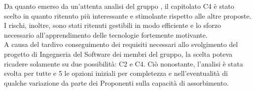 Da quanto emerso da un’attenta analisi del gruppo \GRUPPO, il capitolato C4 è stato scelto in quanto ritenuto più interessante e stimolante rispetto alle altre proposte. I rischi, inoltre, sono stati ritenuti gestibili in modo efficiente e lo sforzo necessario all’apprendimento delle tecnologie fortemente motivante. \\ A causa del tardivo conseguimento dei requisiti necessari allo svolgimento del progetto di Ingegneria del Software dei membri del gruppo, la scelta poteva ricadere solamente su due possibilità: C2 e C4. Ciò nonostante, l'analisi è stata svolta per tutte e 5 le opzioni iniziali per completezza e nell’eventualità di qualche variazione da parte dei Proponenti sulla capacità di assorbimento.
